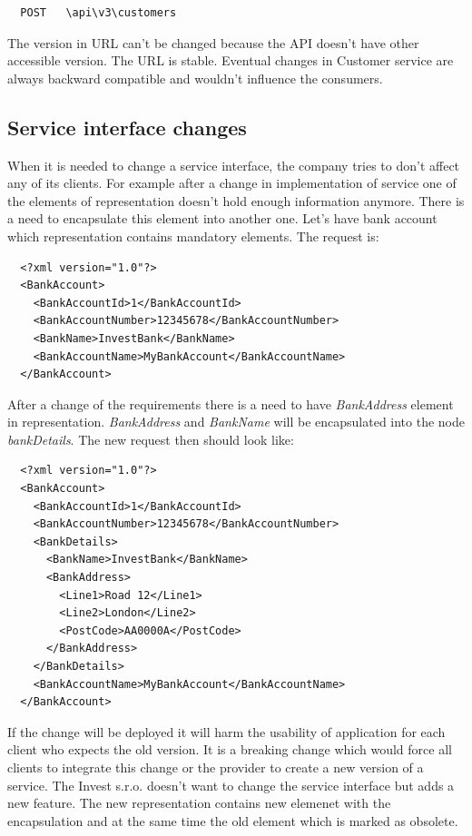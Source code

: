 \begin{lstlisting}
  POST   \api\v3\customers
\end{lstlisting}

The version in URL can't be changed because the API doesn't have other accessible version. The URL is stable. Eventual changes in Customer service are always backward compatible and wouldn't influence the consumers. 

\subsection{Service interface changes}
When it is needed to change a service interface, the company tries to don't affect any of its clients. For example after a change in implementation of service one of the elements of representation doesn't hold enough information anymore. There is a need to encapsulate this element into another one. Let's have bank account which representation contains mandatory elements. The request is:

\begin{lstlisting}
  <?xml version="1.0"?>
  <BankAccount>
    <BankAccountId>1</BankAccountId>
    <BankAccountNumber>12345678</BankAccountNumber>
    <BankName>InvestBank</BankName>
    <BankAccountName>MyBankAccount</BankAccountName>
  </BankAccount>
\end{lstlisting}

After a change of the requirements there is a need to have \emph{BankAddress} element in representation. \emph{BankAddress} and \emph{BankName} will be encapsulated into the node \emph{bankDetails}. The new request then should look like:

\begin{lstlisting}
  <?xml version="1.0"?>
  <BankAccount>
    <BankAccountId>1</BankAccountId>
    <BankAccountNumber>12345678</BankAccountNumber>
    <BankDetails>
      <BankName>InvestBank</BankName>
      <BankAddress>
        <Line1>Road 12</Line1>
        <Line2>London</Line2>
        <PostCode>AA0000A</PostCode>
      </BankAddress>
    </BankDetails>
    <BankAccountName>MyBankAccount</BankAccountName>
  </BankAccount>
\end{lstlisting}

If the change will be deployed it will harm the usability of application for each client who expects the old version. It is a breaking change which would force all clients to integrate this change or the provider to create a new version of a service. The Invest s.r.o. doesn't want to change the service interface but adds a new feature. The new representation contains new elemenet with the encapsulation and at the same time the old element which is marked as obsolete.

